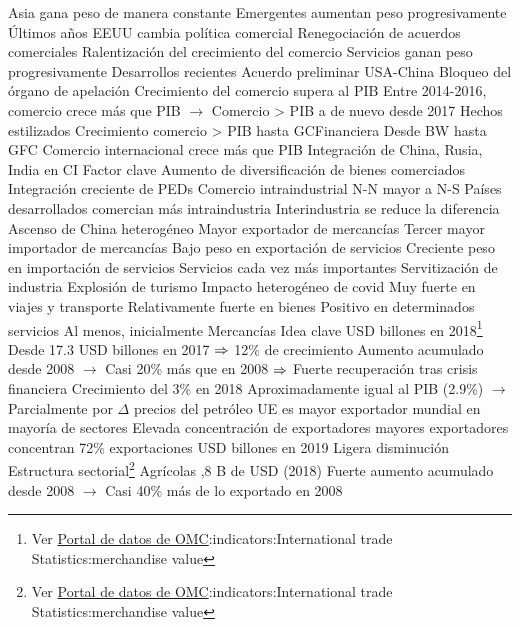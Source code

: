 \documentclass{nuevotema}
\begin{document}
\begin{esquemal}
				\4[] Asia gana peso de manera constante
				\4[] Emergentes aumentan peso progresivamente
				\4 Últimos años
				\4[] EEUU cambia política comercial
				\4[] Renegociación de acuerdos comerciales
				\4[] Ralentización del crecimiento del comercio
				\4[] Servicios ganan peso progresivamente
				\4 Desarrollos recientes
				\4[] Acuerdo preliminar USA-China
				\4[] Bloqueo del órgano de apelación
				\4[] Crecimiento del comercio supera al PIB
				\4[] Entre 2014-2016, comercio crece más que PIB
				\4[] $\to$ Comercio > PIB a de nuevo desde 2017
		\2 Hechos estilizados
			\3[i] Crecimiento comercio > PIB hasta GCFinanciera
				\4 Desde BW hasta GFC
				\4[] Comercio internacional crece más que PIB
				\4 Integración de China, Rusia, India en CI
				\4[] Factor clave
				\4 Aumento de diversificación de bienes comerciados
			\3[ii] Integración creciente de PEDs
			\3[iii] Comercio intraindustrial N-N mayor a N-S
				\4 Países desarrollados comercian más intraindustria
				\4 Interindustria se reduce la diferencia
			\3[iv] Ascenso de China heterogéneo
				\4 Mayor exportador de mercancías
				\4 Tercer mayor importador de mercancías
				\4 Bajo peso en exportación de servicios
				\4 Creciente peso en importación de servicios
			\3[v] Servicios cada vez más importantes
				\4 Servitización de industria
				\4 Explosión de turismo
			\3[vi] Impacto heterogéneo de covid
				\4 Muy fuerte en viajes y transporte
				\4 Relativamente fuerte en bienes
				\4 Positivo en determinados servicios
				\4[] Al menos, inicialmente
		\2 Mercancías
			\3 Idea clave
				 USD billones en 2018\footnote{Ver \href{https://data.wto.org/}{Portal de datos de OMC}:indicators:International trade Statistics:merchandise value }
				\4[] Desde 17.3 USD billones en 2017
				\4[] $\Rightarrow$ 12\% de crecimiento
				\4 Aumento acumulado desde 2008
				\4[] $\to$ Casi 20\% más que en 2008
				\4[] $\Rightarrow$ Fuerte recuperación tras crisis financiera
				\4 Crecimiento del 3\% en 2018
				\4[] Aproximadamente igual al PIB (2.9\%)
				\4[] $\to$ Parcialmente por $\Delta$ precios del petróleo
				\4 UE es mayor exportador mundial en mayoría de sectores
				\4 Elevada concentración de exportadores
				 mayores exportadores concentran 72\% exportaciones
				 USD billones en 2019
				\4[] Ligera disminución
			\3 Estructura sectorial\footnote{Ver \href{https://data.wto.org/}{Portal de datos de OMC}:indicators:International trade Statistics:merchandise value }
				\4 Agrícolas
				,8 B de USD (2018)
				\4[] Fuerte aumento acumulado desde 2008
				\4[] $\to$ Casi 40\% más de lo exportado en 2008

\end{esquemal}
\end{document}
